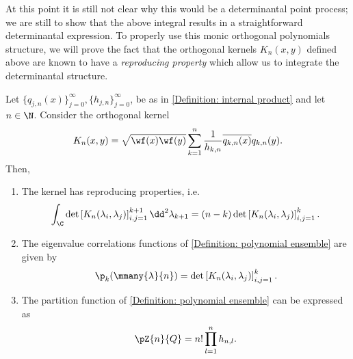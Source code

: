 At this point it is still not clear why this would be a determinantal point process; we are still to show that the above integral results in a straightforward determinantal expression. To properly use this monic orthogonal polynomials structure, we will prove the fact that the orthogonal kernels $K_n(x,y)$ defined above are known to have a \textit{reproducing property} which allow us to integrate the determinantal structure.

 \begin{teorema}	\label{Theorem: Kernel}
	Let $\{q_{j,n}(x)\}_{j=0}^{\infty}, \{h_{j,n}\}_{j=0}^{\infty}$, be as in \autoref{Definition: internal product} and let $n \in \N$. Consider the orthogonal kernel
	\begin{equation}
		K_n(x,y) = \sqrt{\wf(x) \wf(y)} \sum_{k=1}^{n} \frac{1}{h_{k, n}} \overline{q_{k, n}(x)} q_{k,n}(y).
	\end{equation}
	Then,
	\begin{enumerate}
		\item The kernel has reproducing properties, i.e.
		\begin{equation}
			\int_{\C} \det\left[ K_n(\lambda_i, \lambda_j) \right]_{i,j=1}^{k+1} \dd^2 \lambda_{k+1} = (n-k) \det\left[ K_n(\lambda_i, \lambda_j) \right]_{i,j=1}^{k}.
		\end{equation}
		\item The eigenvalue correlations functions of \autoref{Definition:  polynomial ensemble} are given by
			\begin{equation}
			\p_k(\mmany{\lambda}{n}) = \det\left[ K_n(\lambda_i, \lambda_j) \right]_{i,j=1}^{k}.
		\end{equation}
		\item The partition function of  \autoref{Definition:  polynomial ensemble}  can be expressed as
		\begin{equation} \label{proposicaoosition: Partition function}
			\pZ{n}{Q} = n! \prod_{l=1}^n h_{n,l}.
		\end{equation}
	\end{enumerate}
\end{teorema}
